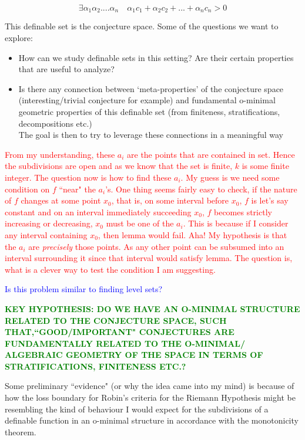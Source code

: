 \begin{equation*}
    \exists\alpha_1\alpha_2....\alpha_n\quad\alpha_1c_1+\alpha_2c_2+...+\alpha_nc_n > 0
\end{equation*}

This definable set is the conjecture space. Some of the questions we want to explore: 
\begin{itemize}
    \item How can we study definable sets in this setting? Are their certain properties that are useful to analyze?
    \item Is there any connection between `meta-properties' of the conjecture space (interesting/trivial conjecture for example) and fundamental o-minimal geometric properties of this definable set (from finiteness, stratifications, decompositions etc.) \\ The goal is then to try to leverage these connections in a meaningful way
\end{itemize}



\textcolor{red}{From my understanding, these $a_i$ are the points that are contained in set. Hence the subdivisions are open and as we know that the set is finite, $k$ is some finite integer. The question now is how to find these $a_i$. My guess is we need some condition on $f$ ``near" the $a_i$'s. One thing seems fairly easy to check, if the nature of $f$ changes at some point $x_0$, that is, on some interval before $x_0$, $f$ is let's say constant and on an interval immediately succeeding $x_0$, $f$ becomes strictly increasing or decreasing, $x_0$ must be one of the $a_i$. This is because if I consider any interval containing $x_0$, then lemma would fail. Aha! My hypothesis is that the $a_i$ are \textit{precisely} those points. As any other point can be subsumed into an interval surrounding it since that interval would satisfy lemma. The question is, what is a clever way to test the condition I am suggesting.}
\par
\textcolor{blue}{Is this problem similar to finding level sets?}

\textcolor{green}{\textbf{KEY HYPOTHESIS: DO WE HAVE AN O-MINIMAL STRUCTURE RELATED TO THE CONJECTURE SPACE, SUCH THAT,``GOOD/IMPORTANT" CONJECTURES 
ARE FUNDAMENTALLY RELATED TO THE O-MINIMAL/ ALGEBRAIC GEOMETRY OF THE SPACE IN TERMS OF STRATIFICATIONS, FINITENESS ETC.?}
}

Some preliminary ``evidence" (or why the idea came into my mind) is because of how the loss boundary for Robin's criteria for the Riemann Hypothesis might be resembling the kind of behaviour I would expect for the subdivisions of a definable function in an o-minimal structure in accordance with the monotonicity theorem.

